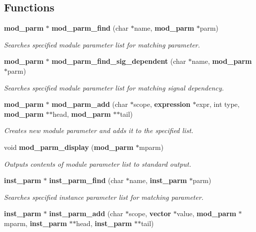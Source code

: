 \subsection*{Functions}
\begin{CompactItemize}
\item 
{\bf mod\_\-parm} $\ast$ {\bf mod\_\-parm\_\-find} (char $\ast$name, {\bf mod\_\-parm} $\ast$parm)
\begin{CompactList}\small\item\em Searches specified module parameter list for matching parameter.\item\end{CompactList}\item 
{\bf mod\_\-parm} $\ast$ {\bf mod\_\-parm\_\-find\_\-sig\_\-dependent} (char $\ast$name, {\bf mod\_\-parm} $\ast$parm)
\begin{CompactList}\small\item\em Searches specified module parameter list for matching signal dependency.\item\end{CompactList}\item 
{\bf mod\_\-parm} $\ast$ {\bf mod\_\-parm\_\-add} (char $\ast$scope, {\bf expression} $\ast$expr, int type, {\bf mod\_\-parm} $\ast$$\ast$head, {\bf mod\_\-parm} $\ast$$\ast$tail)
\begin{CompactList}\small\item\em Creates new module parameter and adds it to the specified list.\item\end{CompactList}\item 
void {\bf mod\_\-parm\_\-display} ({\bf mod\_\-parm} $\ast$mparm)
\begin{CompactList}\small\item\em Outputs contents of module parameter list to standard output.\item\end{CompactList}\item 
{\bf inst\_\-parm} $\ast$ {\bf inst\_\-parm\_\-find} (char $\ast$name, {\bf inst\_\-parm} $\ast$parm)
\begin{CompactList}\small\item\em Searches specified instance parameter list for matching parameter.\item\end{CompactList}\item 
{\bf inst\_\-parm} $\ast$ {\bf inst\_\-parm\_\-add} (char $\ast$scope, {\bf vector} $\ast$value, {\bf mod\_\-parm} $\ast$mparm, {\bf inst\_\-parm} $\ast$$\ast$head, {\bf inst\_\-parm} $\ast$$\ast$tail)

\end{CompactItemize}
